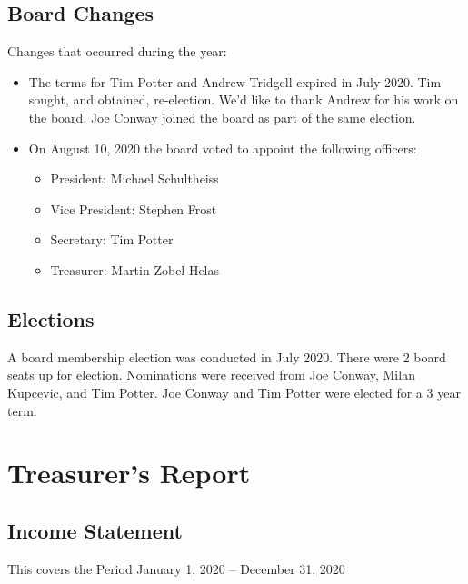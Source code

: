 \documentclass[a4paper]{report}
\begin{document}
\section{Board Changes}

Changes that occurred during the year:

\begin{itemize}

\item The terms for Tim Potter and Andrew Tridgell expired in July 2020.  Tim sought, and obtained, re-election.  We'd like to thank Andrew for his work on the board.  Joe Conway joined the board as part of the same election.

\item On August 10, 2020 the board voted to appoint the following officers:

\begin{itemize}
\item President: Michael Schultheiss
\item Vice President: Stephen Frost
\item Secretary: Tim Potter
\item Treasurer: Martin Zobel-Helas
\end{itemize}

\end{itemize}

\section{Elections}

A board membership election was conducted in July 2020.  There were 2 board seats up for election.  Nominations were received from Joe Conway, Milan Kupcevic, and Tim Potter.  Joe Conway and Tim Potter were elected for a 3 year term.

\chapter{Treasurer's Report}

\section{Income Statement}

This covers the Period January 1, 2020 -- December 31, 2020

\begin{verbatim}
\end{verbatim}
\end{document}
